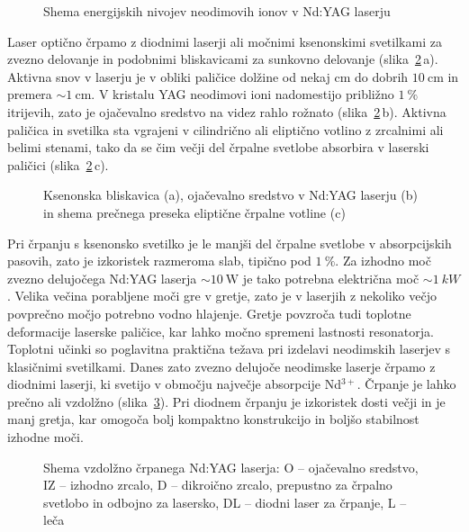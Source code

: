 \begin{figure}[ht]
\centering
\def\svgwidth{95truemm} 

\caption{Shema energijskih nivojev neodimovih ionov v Nd:YAG laserju}
\label{fig:NdE}
\end{figure}
Laser optično črpamo z diodnimi laserji 
ali močnimi ksenonskimi svetilkami za zvezno delovanje 
in podobnimi bliskavicami za sunkovno delovanje (slika~\ref{fig:Nd}\,a). 
Aktivna snov v laserju je v obliki paličice dolžine od nekaj cm do dobrih 
$10~\si{\centi\metre}$ in premera $\sim 1~\si{\centi\metre}$. 
V kristalu YAG neodimovi ioni nadomestijo približno $1~\%$ itrijevih, zato je ojačevalno
sredstvo na videz rahlo rožnato (slika~\ref{fig:Nd}\,b). 
Aktivna paličica in svetilka sta vgrajeni v cilindrično ali eliptično votlino z 
zrcalnimi ali belimi stenami, tako da se čim večji del črpalne svetlobe absorbira v 
laserski paličici (slika~\ref{fig:Nd}\,c).

\begin{figure}[ht]
\centering
\def\svgwidth{128truemm} 

\caption{Ksenonska bliskavica (a), ojačevalno sredstvo v Nd:YAG laserju (b) 
in shema prečnega preseka eliptične črpalne votline (c)}
\label{fig:Nd}
\end{figure}

Pri črpanju s ksenonsko svetilko je le manjši del črpalne svetlobe v
absorpcijskih pasovih, zato je izkoristek razmeroma slab, tipično 
pod $1~\%$. Za izhodno moč zvezno delujočega Nd:YAG laserja $\sim 10~\si{\watt}$ je tako
potrebna električna moč $\sim 1~\si{kW}$. Velika večina porabljene moči 
gre v gretje, zato je v laserjih z nekoliko večjo povprečno
močjo potrebno vodno hlajenje. Gretje povzroča tudi toplotne deformacije
laserske paličice, kar lahko močno spremeni lastnosti resonatorja. Toplotni
učinki so poglavitna praktična težava pri izdelavi neodimskih
laserjev s klasičnimi svetilkami. Danes zato zvezno delujoče neodimske laserje
črpamo z diodnimi laserji, ki svetijo v območju največje
absorpcije Nd$^{3+}$. Črpanje je lahko prečno ali vzdolžno (slika~\ref{fig:NdS}). 
Pri diodnem črpanju je izkoristek dosti večji in je manj gretja, kar omogoča 
bolj kompaktno konstrukcijo in boljšo stabilnost izhodne moči.
\begin{figure}[ht]
\centering
\def\svgwidth{120truemm} 
\caption{Shema vzdolžno črpanega Nd:YAG laserja: O -- ojačevalno sredstvo, 
IZ -- izhodno zrcalo, D -- dikroično zrcalo, 
prepustno za črpalno svetlobo in odbojno za lasersko, DL -- diodni 
laser za črpanje, L -- leča
}
\label{fig:NdS}
\end{figure}

